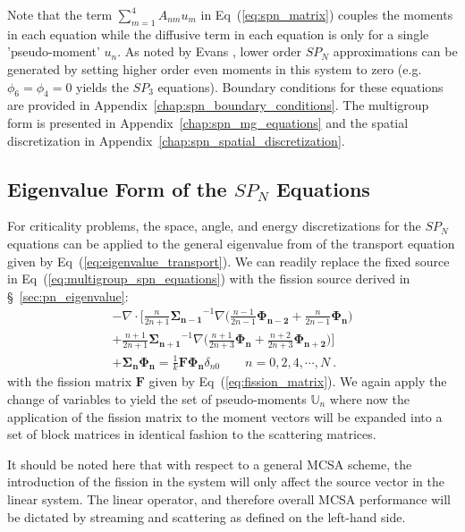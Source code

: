 Note that the term $\sum_{m=1}^4 A_{nm} u_m$ in
Eq~(\ref{eq:spn_matrix}) couples the moments in each equation while
the diffusive term in each equation is only for a single
'pseudo-moment' $u_n$. As noted by Evans \citep{evans_simpli_2013},
lower order $SP_N$ approximations can be generated by setting higher
order even moments in this system to zero (e.g. $\phi_6 = \phi_4 = 0$
yields the $SP_3$ equations). Boundary conditions for these equations
are provided in Appendix~\ref{chap:spn_boundary_conditions}. The
multigroup form is presented in Appendix~\ref{chap:spn_mg_equations}
and the spatial discretization in
Appendix~\ref{chap:spn_spatial_discretization}.

\subsection{Eigenvalue Form of the $SP_N$ Equations}
\label{subsec:eigenvalue_form}
For criticality problems, the space, angle, and energy discretizations
for the $SP_N$ equations can be applied to the general eigenvalue from
of the transport equation given by
Eq~(\ref{eq:eigenvalue_transport}). We can readily replace the fixed
source in Eq~(\ref{eq:multigroup_spn_equations}) with the fission
source derived in \S~\ref{sec:pn_eigenvalue}:
\begin{multline}
  -\nabla \cdot \Bigg[\frac{n}{2n+1}\mathbf{\Sigma_{n-1}}^{-1} \nabla
    \Big(\frac{n-1}{2n-1} \mathbf{\Phi_{n-2}} +
    \frac{n}{2n-1}\mathbf{\Phi_n} \Big) \\+
    \frac{n+1}{2n+1}\mathbf{\Sigma_{n+1}}^{-1} \nabla
    \Big(\frac{n+1}{2n+3}\mathbf{\Phi_n} +
    \frac{n+2}{2n+3}\mathbf{\Phi_{n+2}}\Big) \Bigg] \\+
  \mathbf{\Sigma_n} \mathbf{\Phi_n} = \frac{1}{k} \mathbf{F}
  \mathbf{\Phi_n} \delta_{n0} \ \ \ \ \ \ \ \ \ n = 0,2,4,\cdots,N\:.
  \label{eq:multigroup_spn_eigenvalue}
\end{multline}
with the fission matrix $\mathbf{F}$ given by
Eq~(\ref{eq:fission_matrix}). We again apply the change of variables
to yield the set of pseudo-moments $\mathbb{U}_n$ where now the
application of the fission matrix to the moment vectors will be
expanded into a set of block matrices in identical fashion to the
scattering matrices.

It should be noted here that with respect to a general MCSA scheme,
the introduction of the fission in the system will only affect the
source vector in the linear system. The linear operator, and therefore
overall MCSA performance will be dictated by streaming and scattering
as defined on the left-hand side.

